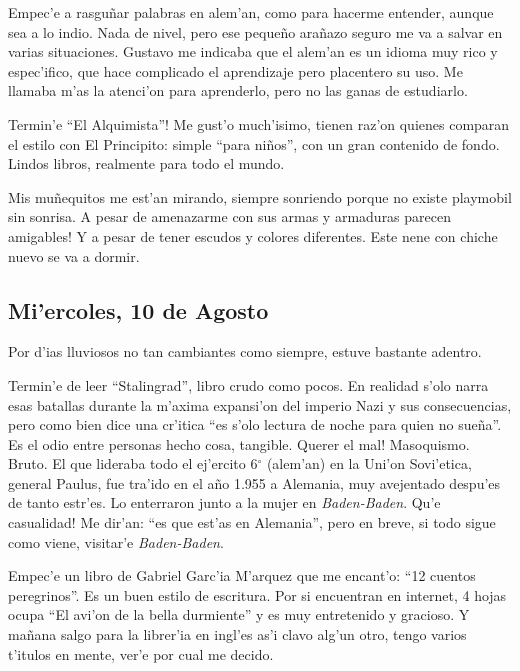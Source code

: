 Empec'e a rasgu\~nar palabras en alem'an, como para hacerme entender, aunque sea
a lo indio. Nada de nivel, pero ese peque\~no ara\~nazo seguro me va a salvar en
varias situaciones. Gustavo me indicaba que el alem'an es un idioma muy rico y
espec'ifico, que hace complicado el aprendizaje pero placentero su uso. Me
llamaba m'as la atenci'on para aprenderlo, pero no las ganas de estudiarlo.

\textexclamdown Termin'e ``El Alquimista''! Me gust'o much'isimo, tienen raz'on
quienes comparan el estilo con El Principito: simple ``para ni\~nos'', con un
gran contenido de fondo. Lindos libros, realmente para todo el mundo.

Mis mu\~nequitos me est'an mirando, siempre sonriendo porque no existe playmobil
sin sonrisa. \textexclamdown A pesar de amenazarme con sus armas y armaduras
parecen amigables! Y a pesar de tener escudos y colores diferentes. Este nene
con chiche nuevo se va a dormir.

\subsection*{Mi'ercoles, 10 de Agosto}

Por d'ias lluviosos no tan cambiantes como siempre, estuve bastante adentro.

Termin'e de leer ``Stalingrad'', libro crudo como pocos. En realidad s'olo narra
esas batallas durante la m'axima expansi'on del imperio Nazi y sus
consecuencias, pero como bien dice una cr'itica ``es s'olo lectura de noche para
quien no sue\~na''. Es el odio entre personas hecho cosa, tangible.
\textexclamdown Querer el mal! Masoquismo. Bruto. El que lideraba todo el
ej'ercito 6$^{\circ}$ (alem'an) en la Uni'on Sovi'etica, general Paulus, fue
tra'ido en el a\~no 1.955 a Alemania, muy avejentado despu'es de tanto estr'es.
Lo enterraron junto a la mujer en \emph{Baden-Baden}. \textexclamdown Qu'e
casualidad! Me dir'an: ``es que est'as en Alemania'', pero en breve, si todo
sigue como viene, visitar'e \emph{Baden-Baden}.

Empec'e un libro de Gabriel Garc'ia M'arquez que me encant'o: ``12 cuentos
peregrinos''. Es un buen estilo de escritura. Por si encuentran en internet, 4
hojas ocupa ``El avi'on de la bella durmiente'' y es muy entretenido y gracioso.
Y ma\~nana salgo para la librer'ia en ingl'es as'i clavo alg'un otro, tengo
varios t'itulos en mente, ver'e por cual me decido.

